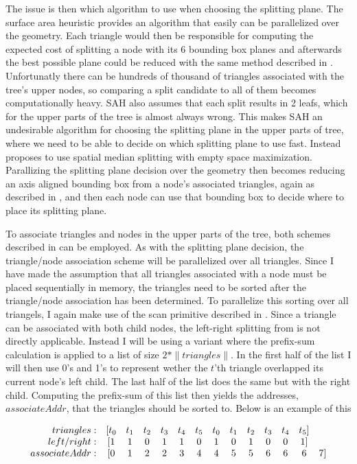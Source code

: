 The issue is then which algorithm to use when choosing the splitting
plane. The surface area heuristic provides an algorithm that easily
can be parallelized over the geometry. Each triangle would then be
responsible for computing the expected cost of splitting a node with
its 6 bounding box planes and afterwards the best possible plane could
be reduced with the same method described in
. Unfortunatly there can be hundreds of
thousand of triangles associated with the tree's upper nodes, so
comparing a split candidate to all of them becomes computationally
heavy. SAH also assumes that each split results in 2 leafs, which for
the upper parts of the tree is almost always wrong. This makes SAH an
undesirable algorithm for choosing the splitting plane in the upper
parts of tree, where we need to be able to decide on which splitting
plane to use fast. Instead \zhou{} proposes to use spatial median
splitting with empty space maximization. Parallizing the splitting
plane decision over the geometry then becomes reducing an axis aligned
bounding box from a node's associated triangles, again as described in
, and then each node can use that bounding box
to decide where to place its splitting plane. 

To associate triangles and nodes in the upper parts of the tree, both
schemes described in  can be
employed. As with the splitting plane decision, the triangle/node
association scheme will be parallelized over all triangles. Since I
have made the assumption that all triangles associated with a node
must be placed sequentially in memory, the triangles need to be sorted
after the triangle/node association has been determined. To
parallelize this sorting over all triangels, I again make use of the
scan primitive described in . Since a
triangle can be associated with both child nodes, the left-right
splitting from  is not directly
applicable. Instead I will be using a variant where the prefix-sum
calculation is applied to a list of size $2 * \|triangles\|$. In the
first half of the list I will then use 0's and 1's to represent wether
the $t$'th triangle overlapped its current node's left child. The last
half of the list does the same but with the right child. Computing the
prefix-sum of this list then yields the addresses, $associateAddr$,
that the triangles should be sorted to. Below is an example of this

\begin{displaymath}
  \begin{array}{r c c c c c c c c c c c c c}
    triangles: & [t_0 & t_1 & t_2 & t_3 & t_4 & t_5 & t_0 & t_1 & t_2 & t_3 & t_4 & t_5]\\
    left/right: & [1 & 1 & 0 & 1 & 1 & 0 & 1 & 0 & 1 & 0 & 0 & 1]\\
    associateAddr: & [0 & 1 & 2 & 2 & 3 & 4 & 4 & 5 & 5 & 6 & 6 & 6 & 7]\\
  \end{array}
\end{displaymath}

